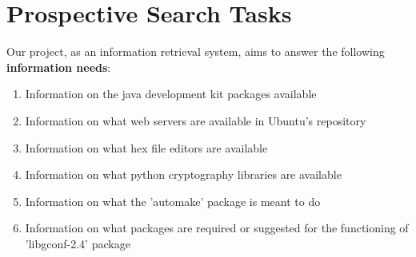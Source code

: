 \section{Prospective Search Tasks}
\label{sec:Prospective Search Tasks}

Our project, as an information retrieval system, aims to answer the following \textbf{information needs}:

\begin{enumerate}
    \item Information on the java development kit packages available
    \item Information on what web servers are available in Ubuntu's repository
    \item Information on what hex file editors are available
    \item Information on what python cryptography libraries are available
    \item Information on what the 'automake' package is meant to do
    \item Information on what packages are required or suggested for the functioning of 'libgconf-2.4' package
\end{enumerate}


